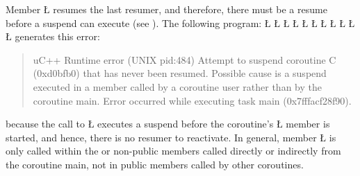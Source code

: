 \documentclass[openright,twoside]{report}
\begin{document}
Member \LGinlinetrue\LGbegin\lgrinde\L{}\endlgrinde\LGend{} resumes the last resumer, and therefore, there must be a resume before a suspend can execute (see ).
The following program:
\LGinlinefalse\LGbegin\lgrinde
\L{}
\L{\LB{}}
\L{}
\L{\LB{}}
\L{\LB{}}
\CE{}\L{\LB{}}
\L{\LB{\};}}
\L{}
\L{\LB{}}
\L{\LB{}}
\L{\LB{\}}}
\endlgrinde\LGend
generates this error:
\begin{quote}
\BGfont
uC++ Runtime error (UNIX pid:484) Attempt to suspend coroutine C (0xd0bfb0) that has never been resumed.
Possible cause is a suspend executed in a member called by a coroutine user rather than by the coroutine main.
Error occurred while executing task main (0x7fffacf28f90).
\end{quote}
because the call to \LGinlinetrue\LGbegin\lgrinde\L{}\endlgrinde\LGend{} executes a suspend before the coroutine's \LGinlinetrue\LGbegin\lgrinde\L{}\endlgrinde\LGend{} member is started, and hence, there is no resumer to reactivate.
In general, member \LGinlinetrue\LGbegin\lgrinde\L{}\endlgrinde\LGend{} is only called within the  or non-public members called directly or indirectly from the coroutine main, not in public members called by other coroutines.
\end{document}
